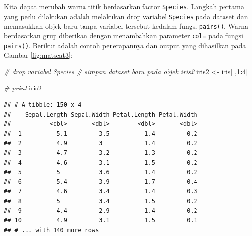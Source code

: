 \documentclass[]{book}
\newenvironment{Shaded}{\begin{snugshade}}{\end{snugshade}}
\newcommand{\KeywordTok}[1]{\textcolor[rgb]{0.13,0.29,0.53}{\textbf{#1}}}
\newcommand{\DataTypeTok}[1]{\textcolor[rgb]{0.13,0.29,0.53}{#1}}
\newcommand{\DecValTok}[1]{\textcolor[rgb]{0.00,0.00,0.81}{#1}}
\newcommand{\StringTok}[1]{\textcolor[rgb]{0.31,0.60,0.02}{#1}}
\newcommand{\CommentTok}[1]{\textcolor[rgb]{0.56,0.35,0.01}{\textit{#1}}}
\newcommand{\OtherTok}[1]{\textcolor[rgb]{0.56,0.35,0.01}{#1}}
\newcommand{\OperatorTok}[1]{\textcolor[rgb]{0.81,0.36,0.00}{\textbf{#1}}}
\newcommand{\NormalTok}[1]{#1}
\begin{document}
Kita dapat merubah warna titik berdasarkan factor \texttt{Species}.
Langkah pertama yang perlu dilakukan adalah melakukan drop variabel
\texttt{Species} pada dataset dan memasukkan objek baru tanpa variabel
tersebut kedalam fungsi \texttt{pairs()}. Warna berdasarkan grup
diberikan dengan menambahkan parameter \texttt{col=} pada fungsi
\texttt{pairs()}. Berikut adalah contoh penerapannya dan output yang
dihasilkan pada Gambar \ref{fig:matscat3}:

\begin{Shaded}
\begin{Highlighting}[]
\CommentTok{# drop variabel Species}
\CommentTok{# simpan dataset baru pada objek iris2}
\NormalTok{iris2 <-}\StringTok{ }\NormalTok{iris[ ,}\DecValTok{1}\OperatorTok{:}\DecValTok{4}\NormalTok{]}

\CommentTok{# print}
\NormalTok{iris2}
\end{Highlighting}
\end{Shaded}

\begin{verbatim}
## # A tibble: 150 x 4
##    Sepal.Length Sepal.Width Petal.Length Petal.Width
##           <dbl>       <dbl>        <dbl>       <dbl>
##  1          5.1         3.5          1.4         0.2
##  2          4.9         3            1.4         0.2
##  3          4.7         3.2          1.3         0.2
##  4          4.6         3.1          1.5         0.2
##  5          5           3.6          1.4         0.2
##  6          5.4         3.9          1.7         0.4
##  7          4.6         3.4          1.4         0.3
##  8          5           3.4          1.5         0.2
##  9          4.4         2.9          1.4         0.2
## 10          4.9         3.1          1.5         0.1
## # ... with 140 more rows
\end{verbatim}

\begin{Shaded}
\end{Shaded}
\end{document}
